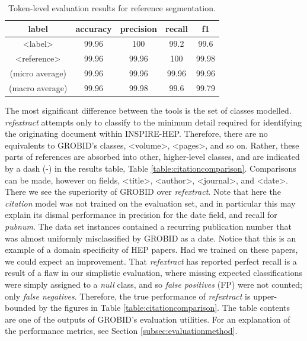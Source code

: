 \begin{table}[h]
\begin{center}
\begin{tabular}{|c|cccc|}
\hline
label           & accuracy  & precision  & recall   & f1 \\
\hline
<label>         & 99.96     & 100        & 99.2     & 99.6\\
<reference>     & 99.96     & 99.96      & 100      & 99.98\\
\hline
(micro average) & 99.96     & 99.96      & 99.96    & 99.96  \\
(macro average) & 99.96     & 99.98      & 99.6     & 99.79  \\
\hline
\end{tabular}
\caption[Token-level evaluation results for reference segmentation.]{Token-level evaluation results for reference segmentation.}
\label{table:referencesegmenterresults}
\end{center}
\end{table}

The most significant difference between the tools is the set of classes modelled. \emph{refextract} attempts only to classify to the minimum detail required for identifying the originating document within INSPIRE-HEP. Therefore, there are no equivalents to GROBID's classes, <volume>, <pages>, and so on. Rather, these parts of references are absorbed into other, higher-level classes, and are indicated by a dash (-) in the results table, Table \ref{table:citationcomparison}. Comparisons can be made, however on fields, <title>, <author>, <journal>, and <date>. There we see the superiority of GROBID over \emph{refextract}. Note that here the \emph{citation} model was not trained on the evaluation set, and in particular this may explain its dismal performance in precision for the date field, and recall for \emph{pubnum}. The data set instances contained a recurring publication number that was almost uniformly misclassified by GROBID as a date. Notice that this is an example of a domain specificity of HEP papers. Had we trained on these papers, we could expect an improvement. That \emph{refextract} has reported perfect recall is a result of a flaw in our simplistic evaluation, where missing expected classifications were simply assigned to a \emph{null} class, and so \emph{false positives} (FP) were not counted; only \emph{false negatives}. Therefore, the true performance of \emph{refextract} is upper-bounded by the figures in Table \ref{table:citationcomparison}. The table contents are one of the outputs of GROBID's evaluation utilities. For an explanation of the performance metrics, see Section \ref{subsec:evaluationmethod}.


